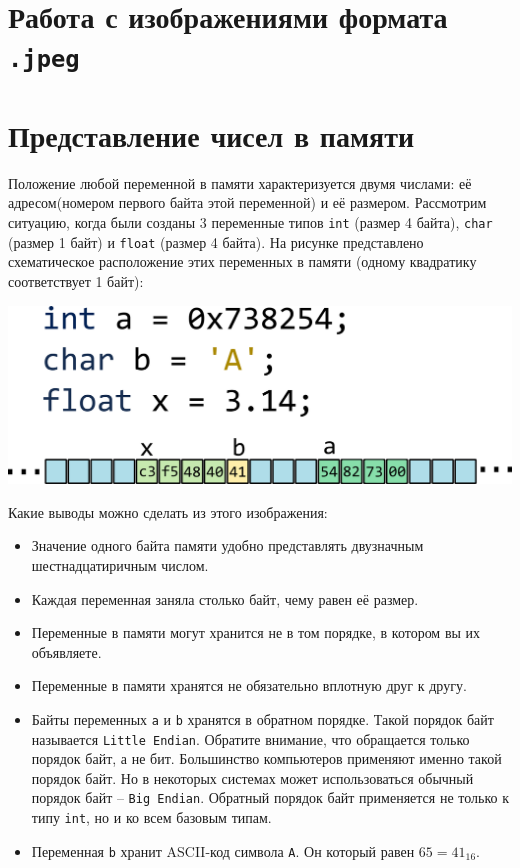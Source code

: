\documentclass{article}
\begin{document}
\newpage
\section*{Работа с изображениями формата \texttt{.jpeg}}



\newpage
\section*{Представление чисел в памяти}
Положение любой переменной в памяти характеризуется двумя числами: её адресом(номером первого байта этой переменной) и её размером. Рассмотрим ситуацию, когда были созданы 3 переменные типов \texttt{int} (размер 4 байта), \texttt{char} (размер 1 байт) и \texttt{float} (размер 4 байта).
На рисунке представлено схематическое расположение этих переменных в памяти (одному квадратику соответствует 1 байт):

\begin{center}
\includegraphics[scale=1]{../images/memory/memory_2_different_types.png}
\end{center}
Какие выводы можно сделать из этого изображения:
\begin{itemize}
\item Значение одного байта памяти удобно представлять двузначным шестнадцатиричным числом.
\item Каждая переменная заняла столько байт, чему равен её размер.
\item Переменные в памяти могут хранится не в том порядке, в котором вы их объявляете.
\item Переменные в памяти хранятся не обязательно вплотную друг к другу.
\item Байты переменных \texttt{a} и \texttt{b} хранятся в обратном порядке. Такой порядок байт называется \texttt{Little Endian}.  Обратите внимание, что обращается только порядок байт, а не бит. Большинство компьютеров применяют именно такой порядок байт. Но в некоторых системах может использоваться обычный порядок байт -- \texttt{Big Endian}. Обратный порядок байт применяется не только к типу \texttt{int}, но и ко всем базовым типам.
\item Переменная \texttt{b} хранит ASCII-код символа \texttt{A}. Он который равен $65 = 41_{16}$.
\end{itemize}
\end{document}
